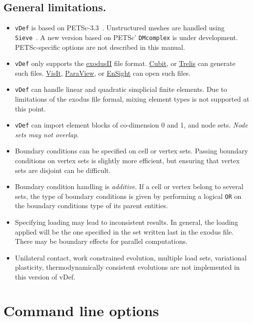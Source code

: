\documentclass[10pt,oneside]{memoir}
\def\vDef{{\texttt{vDef}} }
\begin{document}
\section{General limitations.}
\begin{itemize}
\item \vDef is based on PETSc-3.3~\cite{petsc-efficient,petsc-user-ref,petsc-web-page}. Unstructured meshes are handled using \texttt{Sieve}~\cite{Knepley-Karpeev-2009a}. A new version based on PETSc' \texttt{DMcomplex} is under development. PETSc-specific options are not described in this manual.
\item \vDef only supports the \href{http://sourceforge.net/projects/exodusii/}{exodusII} file format. \href{http://cubit.sandia.gov}{Cubit}, or \href{http://www.csimsoft.com/trelis.jsp}{Trelis} can generate such files. \href{https://wci.llnl.gov/codes/visit/}{VisIt}, \href{http://paraview.org}{ParaView}, or \href{http://www.ceisoftware.com}{EnSight} can open such files.
\item \vDef can handle linear and quadratic simplicial finite elements. Due to limitations of the exodus file formal, mixing element types is not supported at this point.
\item \vDef can import element blocks of co-dimension 0 and 1, and node sets. \emph{Node sets may not overlap}.
\item Boundary conditions can be specified on cell or vertex sets. Passing boundary conditions on vertex sets is slightly more efficient, but ensuring that vertex sets are disjoint can be difficult.
\item Boundary condition handling is \emph{additive}. If a cell or vertex belong to several sets, the type of boundary conditions is given by performing a logical \verb+OR+ on the boundary conditions type of its parent entities. 
\item Specifying loading may lead to inconsistent results. In general, the loading applied will be the one specified in the set written last in the exodus file. There may be boundary effects for parallel computations.
\item Unilateral contact, work constrained evolution, multiple load sets, variational plasticity, thermodynamically consistent evolutions are not implemented in this version of vDef.
\end{itemize}

\chapter{Command line options}
\end{document}
